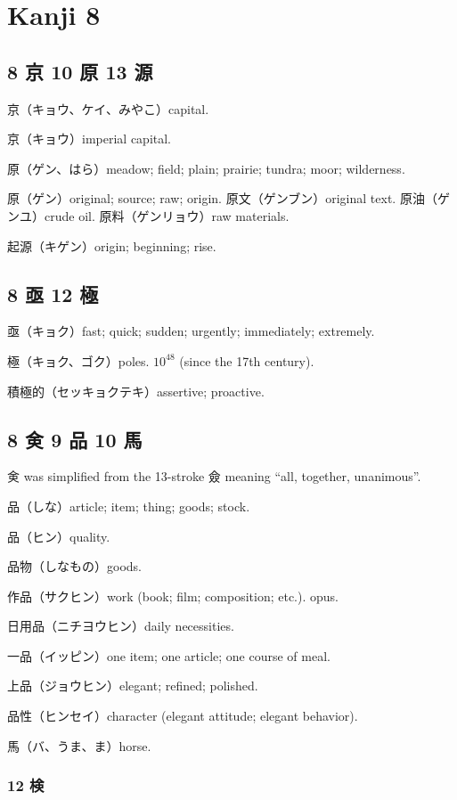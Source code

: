 \chapter{Kanji 8}

\section{8 京 10 原 13 源}

京（キョウ、ケイ、みやこ）capital.

京（キョウ）imperial capital.

原（ゲン、はら）meadow; field; plain; prairie; tundra; moor; wilderness.

原（ゲン）original; source; raw; origin.
原文（ゲンブン）original text.
原油（ゲンユ）crude oil.
原料（ゲンリョウ）raw materials.

起源（キゲン）origin; beginning; rise.

\section{8 亟 12 極}

亟（キョク）fast; quick; sudden; urgently; immediately; extremely.

極（キョク、ゴク）poles.
\(10^{48}\) (since the 17th century).

積極的（セッキョクテキ）assertive; proactive.

\section{8 㑒 9 品 10 馬}

㑒 was simplified from the 13-stroke 僉
meaning ``all, together, unanimous''.

品（しな）article; item; thing; goods; stock.

品（ヒン）quality.

品物（しなもの）goods.

作品（サクヒン）work (book; film; composition; etc.). opus.

日用品（ニチヨウヒン）daily necessities.

一品（イッピン）one item; one article; one course of meal.

上品（ジョウヒン）elegant; refined; polished.

品性（ヒンセイ）character (elegant attitude; elegant behavior).

馬（バ、うま、ま）horse.

\subsection{12 検}

